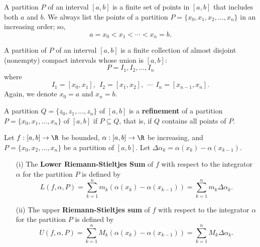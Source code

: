 \begin{definition}[Partition]
    A partition \( P  \) of an interval \( [a,b] \) is a finite set of points in \( [a,b] \) that includes both \( a  \) and \( b  \). We always list the points of a partition \( P = \{  {x}_{0} , {x}_{1}, {x}_{2}, \dots, {x}_{n} \}  \) in an increasing order; so, 
    \[  a = {x}_{0} < {x}_{1}< \cdots < {x}_{n} = b.  \]
\end{definition}

\begin{remark}
    A partition of \( P  \) of an interval \( [a,b] \) is a finite collection of almost disjoint (nonempty) compact intervals whose union is \( [a,b] \): 
    \[  P = {I}_{1}, {I}_{2}, \dots, {I}_{n} \]
    where
    \[  {I}_{1} = [{x}_{0}, {x}_{1}], \ \ {I}_{2} = [{x}_{1}, {x}_{2}], \ \ \cdots \ \ {I}_{n} = [{x}_{n-1}, {x}_{n}]. \]
    Again, we denote \( {x}_{0} = a  \) and \( {x}_{n} = b  \).
\end{remark}

\begin{definition}\label{Refinement of Partitions}
    A partition \( Q = \{ {z}_{0}, {z}_{1}, \dots, {z}_{n} \}   \) of \( [a,b] \) is a \textbf{refinement} of a partition \( P = \{ {x}_{0}, {x}_{1}, \dots, {x}_{n} \}  \) of \( [a,b] \) if \( P \subseteq   Q  \), that is, if \( Q  \) contains all points of \( P  \).
\end{definition}

\begin{definition}
    Let \( f: [a,b] \to \R  \) be bounded, \( \alpha : [a,b] \to \R  \) be increasing, and \( P = \{ {x}_{0}, {x}_{2}, \dots, {x}_{n} \}  \) be a partition of \( [a,b] \). Let \( \Delta {\alpha}_{k} = \alpha({x}_{k}) - \alpha({x}_{k-1}) \). 
    \begin{enumerate}
        \item[(i)] The \textbf{Lower Riemann-Stieltjes Sum} of \( f  \) with respect to the integrator \( \alpha \) for the partition \( P  \) is defined by 
            \[  L(f, \alpha, P ) = \sum_{ k=1  }^{ n } {m}_{k} (\alpha({x}_{k}) - \alpha({x}_{k-1})) = \sum_{ k=1  }^{ n } {m}_{k} \Delta {\alpha}_{ k }. \] 
        \item[(ii)] The upper \textbf{Riemann-Stieltjes sum} of \( f  \) with respect to the integrator \( \alpha  \) for the partition \( P  \) is defined by
            \[  U(f, \alpha, P) = \sum_{ k=1  }^{ n } {M}_{k} (\alpha({x}_{k}) - \alpha({x}_{k-1})) = \sum_{ k=1  }^{ n } {M}_{k } \Delta {\alpha}_{k }. \]
    \end{enumerate}
\end{definition}

